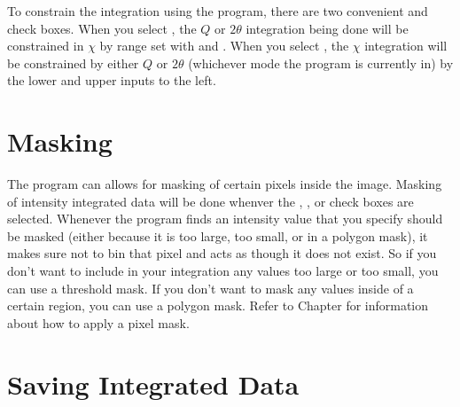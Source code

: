 To constrain the integration using the program,
there are two convenient 
 and 
 check boxes.
When you select
, the
$Q$ or $2\theta$ integration being done
will be constrained in $\chi$ by range
set with  and .
When you select
, the
$\chi$ integration will be constrained by
either $Q$ or $2\theta$ (whichever mode the
program is currently in) by the lower and
upper inputs to the left.

\section{Masking}

The program can allows for masking of certain
pixels inside the image. 
Masking of intensity integrated data will be done
whenver the
, ,
or  check boxes are selected.
Whenever the program finds an intensity value
that you specify should be masked (either because it 
is too large, too small, or in a polygon mask), it makes
sure not to bin that pixel and acts as though
it does not exist. So if you don't want to include
in your integration any values too large or too
small, you can use a threshold mask. If you
don't want to mask any values inside of a certain
region, you can use a polygon mask. 
Refer to Chapter  for information 
about how to apply a pixel mask.

\section{Saving Integrated Data}

